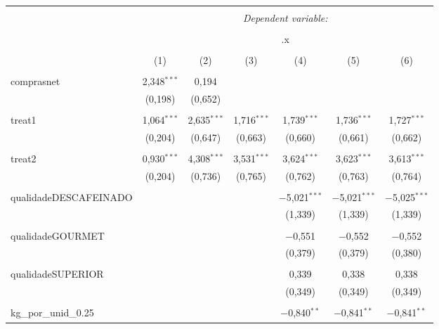 
\begin{table}[!htbp] \centering 
  \caption{} 
  \label{} 
\begin{tabular}{@{\extracolsep{5pt}}lcccccc} 
\\[-1.8ex]\hline 
\hline \\[-1.8ex] 
 & \multicolumn{6}{c}{\textit{Dependent variable:}} \\ 
\cline{2-7} 
\\[-1.8ex] & \multicolumn{6}{c}{.x} \\ 
\\[-1.8ex] & (1) & (2) & (3) & (4) & (5) & (6)\\ 
\hline \\[-1.8ex] 
 comprasnet & 2,348$^{***}$ & 0,194 &  &  &  &  \\ 
  & (0,198) & (0,652) &  &  &  &  \\ 
  & & & & & & \\ 
 treat1 & 1,064$^{***}$ & 2,635$^{***}$ & 1,716$^{***}$ & 1,739$^{***}$ & 1,736$^{***}$ & 1,727$^{***}$ \\ 
  & (0,204) & (0,647) & (0,663) & (0,660) & (0,661) & (0,662) \\ 
  & & & & & & \\ 
 treat2 & 0,930$^{***}$ & 4,308$^{***}$ & 3,531$^{***}$ & 3,624$^{***}$ & 3,623$^{***}$ & 3,613$^{***}$ \\ 
  & (0,204) & (0,736) & (0,765) & (0,762) & (0,763) & (0,764) \\ 
  & & & & & & \\ 
 qualidadeDESCAFEINADO &  &  &  & $-$5,021$^{***}$ & $-$5,021$^{***}$ & $-$5,025$^{***}$ \\ 
  &  &  &  & (1,339) & (1,339) & (1,339) \\ 
  & & & & & & \\ 
 qualidadeGOURMET &  &  &  & $-$0,551 & $-$0,552 & $-$0,552 \\ 
  &  &  &  & (0,379) & (0,379) & (0,380) \\ 
  & & & & & & \\ 
 qualidadeSUPERIOR &  &  &  & 0,339 & 0,338 & 0,338 \\ 
  &  &  &  & (0,349) & (0,349) & (0,349) \\ 
  & & & & & & \\ 
 kg\_por\_unid\_0.25 &  &  &  & $-$0,840$^{**}$ & $-$0,841$^{**}$ & $-$0,841$^{**}$ \\ 

\end{tabular}
\end{table}
